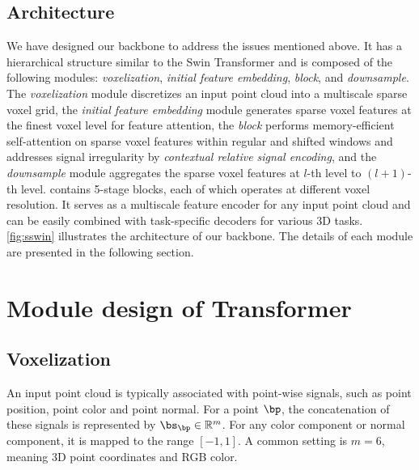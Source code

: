 \documentclass[10pt,twocolumn,letterpaper]{article}
\begin{document}
\subsection{{\SST} Architecture}
We have designed our {\SST} backbone to address the issues mentioned above. It has a hierarchical structure similar to the Swin Transformer and is composed of the following modules: \emph{voxelization}, \emph{initial feature embedding}, \emph{{\SST} block}, and \emph{downsample}. The \emph{voxelization} module discretizes an input point cloud into a multiscale sparse voxel grid, the \emph{initial feature embedding} module generates sparse voxel features at the finest voxel level for feature attention, the \emph{{\SST} block} performs memory-efficient self-attention on sparse voxel features within regular and shifted windows and addresses signal irregularity by \emph{contextual relative signal encoding}, and the \emph{downsample} module aggregates the sparse voxel features at $l$-th level to $(l+1)$-th level. {\SST} contains 5-stage {\SST} blocks, each of which operates at different voxel resolution. It serves as a multiscale feature encoder for any input point cloud and can be easily combined with task-specific decoders for various 3D tasks. \cref{fig:sswin} illustrates the architecture of our backbone. The details of each module are presented in the following section.

\section{Module design of {\SST} Transformer} \label{sec:module}

\subsection{Voxelization} \label{subsec:voxelization}

 An input point cloud is typically associated with point-wise signals, such as point position, point color and point normal. For a point $\bp$, the concatenation of these signals is represented by $\bs_{\bp} \in \mathbb{R}^m$. For any color component or normal component, it is mapped to the range $[-1,1]$.  A common setting is $m=6$, meaning 3D point coordinates and RGB color.
\end{document}
